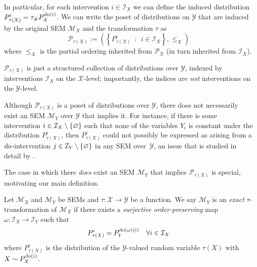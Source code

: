 
In particular, for each intervention $i \in \mathcal{I}_X$ we can define the induced distribution $P_{\tau(X)}^{i} = \tau_{\#}P_X^{\operatorname{do}(i)}$.
We can write the poset of distributions on $\mathcal{Y}$ that are induced by the original SEM $\mathcal{M}_X$ and the transformation $\tau$ as
\[\mathcal{P}_{\tau(X)} := \left( \left\{ P_{\tau(X)}^{i} \enspace : \enspace i \in \mathcal{I}_X \right\}, \leq_X \right) \]
where $\leq_X$ is the partial ordering inherited from $\mathcal{P}_X$ (in turn inherited from $\mathcal{I}_X$).

$\mathcal{P}_{\tau(X)}$ is just a structured collection of distributions over $\mathcal{Y}$, indexed by interventions $\mathcal{I}_X$ on the $\mathcal{X}$-level; importantly, the indices are \emph{not} interventions on the $\mathcal{Y}$-level.



Although $\mathcal{P}_{\tau(X)}$ is a poset of distributions over $\mathcal{Y}$, there does not necessarily exist an SEM $\mathcal{M}_Y$ over $\mathcal{Y}$ that implies it.
For instance, if there is some intervention ${i \in \mathcal{I}_X \setminus \{ \varnothing \}}$ such that none of the variables $Y_i$ is constant under the distribution $P_{\tau(X)}^{i}$, then $P_{\tau(X)}^{i}$ could not possibly be expressed as arising from a $\operatorname{do}$-intervention $j\in \mathcal{I}_Y \setminus \{\varnothing\}$ in any SEM over~$\mathcal{Y}$, an issue that is studied in detail by \cite{eberhardt2016green}.

The case in which there \emph{does} exist an SEM $\mathcal{M}_Y$ that implies $\mathcal{P}_{\tau(X)}$ is special, motivating our main definition.

\medskip

\begin{definition}\label{def:exacttrafos}
Let $\mathcal{M}_X$ and $\mathcal{M}_Y$ be SEMs and $\tau: \mathcal{X} \to \mathcal{Y}$ be a function.
We say $\mathcal{M}_Y$ is an \emph{exact}  $\tau$-transformation of $\mathcal{M}_X$ if there exists a \emph{surjective order-preserving} map $\omega:\mathcal{I}_X\rightarrow \mathcal{I}_Y$ such that
\[ P_{\tau(X)}^{i} = P_Y^{\operatorname{do}(\omega(i))} \quad \forall i \in \mathcal{I}_X \]
where $P_{\tau(X)}^{i}$ is the distribution of the $\mathcal{Y}$-valued random variable $\tau(X)$ with $X \sim P_X^{\operatorname{do}(i)}$.
\end{definition}

